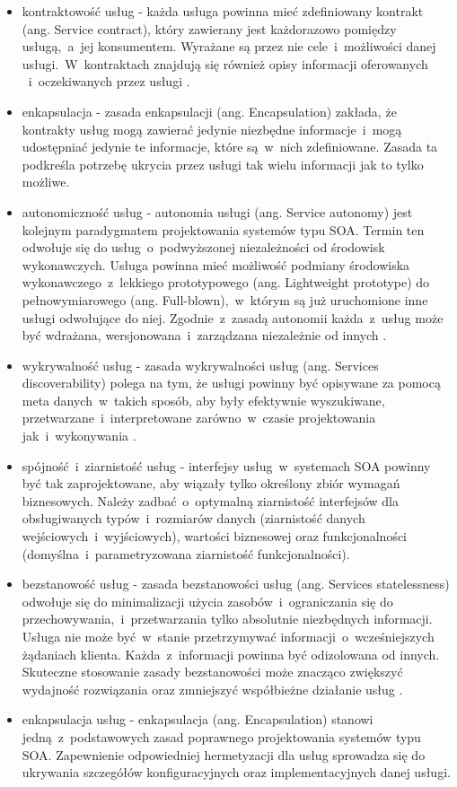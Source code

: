 \begin{itemize}
\item{kontraktowość usług - każda usługa powinna mieć zdefiniowany kontrakt (ang. Service contract), który zawierany jest każdorazowo pomiędzy usługą,~a~jej konsumentem. Wyrażane są przez nie cele~i~możliwości danej usługi.~W~kontraktach znajdują się również opisy informacji oferowanych ~i~oczekiwanych przez usługi \cite{SOAinfoq10}.}
\item{enkapsulacja - zasada enkapsulacji (ang. Encapsulation) zakłada, że kontrakty usług mogą zawierać jedynie niezbędne informacje~i~mogą udostępniać jedynie te informacje, które są~w~nich zdefiniowane. Zasada ta podkreśla potrzebę ukrycia przez usługi tak wielu informacji jak to tylko możliwe.}
\item{autonomiczność usług - autonomia usługi (ang. Service autonomy) jest kolejnym paradygmatem projektowania systemów typu SOA. Termin ten odwołuje się do usług~o~podwyższonej niezależności od środowisk wykonawczych. Usługa powinna mieć możliwość podmiany środowiska wykonawczego~z~lekkiego prototypowego (ang. Lightweight prototype) do pełnowymiarowego (ang. Full-blown),~w~którym są już uruchomione inne usługi odwołujące do niej. Zgodnie~z~zasadą autonomii każda~z~usług może być wdrażana, wersjonowana~i~zarządzana niezależnie od innych \cite{SOAinfoq10}.}
\item{wykrywalność usług - zasada wykrywalności usług (ang. Services discoverability) polega na tym, że usługi powinny być opisywane za pomocą meta danych~w~takich sposób, aby były efektywnie wyszukiwane, przetwarzane~i~interpretowane zarówno~w~czasie projektowania jak~i~wykonywania \cite{SOAinfoq10}.}
\item{spójność~i~ziarnistość usług - interfejsy usług~w~systemach SOA powinny być tak zaprojektowane, aby wiązały tylko określony zbiór wymagań biznesowych. \cite{SOAsdj102009} Należy zadbać~o~optymalną ziarnistość interfejsów dla obsługiwanych typów~i~rozmiarów danych (ziarnistość danych wejściowych~i~wyjściowych), wartości biznesowej oraz funkcjonalności (domyślna~i~parametryzowana ziarnistość funkcjonalności).}
\item{bezstanowość usług - zasada bezstanowości usług (ang. Services statelessness) odwołuje się do minimalizacji użycia zasobów~i~ograniczania się do przechowywania,~i~przetwarzania tylko absolutnie niezbędnych informacji. Usługa nie może być~w~stanie przetrzymywać informacji~o~wcześniejszych żądaniach klienta. Każda~z~informacji powinna być odizolowana od innych. Skuteczne stosowanie zasady bezstanowości może znacząco zwiększyć wydajność rozwiązania oraz zmniejszyć współbieżne działanie usług \cite{SOAsdj102009}.}
\item{enkapsulacja usług - enkapsulacja (ang. Encapsulation) stanowi jedną~z~podstawowych zasad poprawnego projektowania systemów typu SOA. Zapewnienie odpowiedniej hermetyzacji dla usług sprowadza się do ukrywania szczegółów konfiguracyjnych oraz implementacyjnych danej usługi.}
\end{itemize}

